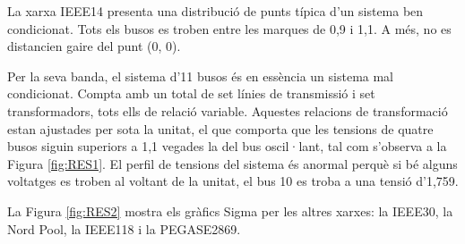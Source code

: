 La xarxa IEEE14 presenta una distribució de punts típica d'un sistema ben condicionat. Tots els busos es troben entre les marques de 0,9 i 1,1. A més, no es distancien gaire del punt (0, 0). 

Per la seva banda, el sistema d'11 busos és en essència un sistema mal condicionat. Compta amb un total de set línies de transmissió i set transformadors, tots ells de relació variable. Aquestes relacions de transformació estan ajustades per sota la unitat, el que comporta que les tensions de quatre busos siguin superiors a 1,1 vegades la del bus oscil·lant, tal com s'observa a la Figura \ref{fig:RES1}. El perfil de tensions del sistema és anormal perquè si bé alguns voltatges es troben al voltant de la unitat, el bus 10 es troba a una tensió d'1,759. 

La Figura \ref{fig:RES2} mostra els gràfics Sigma per les altres xarxes: la IEEE30, la Nord Pool, la IEEE118 i la PEGASE2869. 

